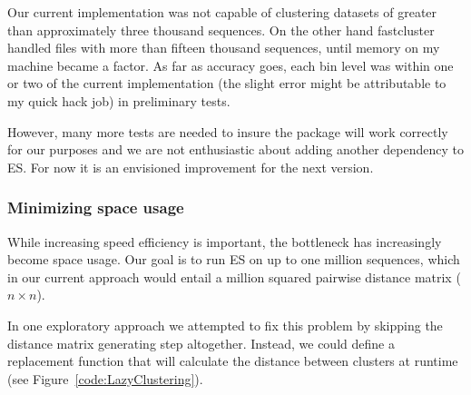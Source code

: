 Our current implementation was not capable of clustering datasets of greater than approximately three thousand sequences.
On the other hand fastcluster handled files with more than fifteen thousand sequences, until memory on my machine became a factor.
As far as accuracy goes, each bin level was within one or two of the current implementation (the slight error might be attributable to my quick hack job) in preliminary tests.

However, many more tests are needed to insure the package will work correctly for our purposes and we are not enthusiastic about adding another dependency to ES.
For now it is an envisioned improvement for the next version.

\subsubsection*{Minimizing space usage}
While increasing speed efficiency is important, the bottleneck has increasingly become space usage.
Our goal is to run ES on up to one million sequences, which in our current approach would entail a million squared pairwise distance matrix ($n \times n$).

In one exploratory approach we attempted to fix this problem by skipping the distance matrix generating step altogether.
Instead, we could define a replacement function that will calculate the distance between clusters at runtime (see Figure~\ref{code:LazyClustering}).



